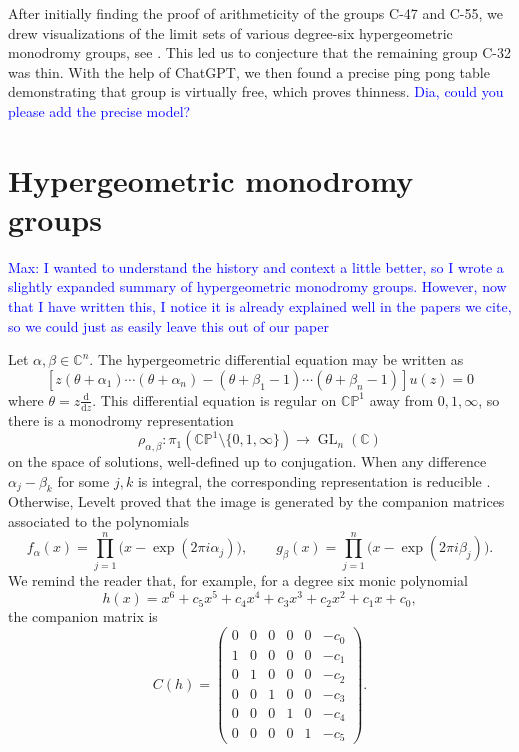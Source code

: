 \documentclass[11pt]{article}
\DeclareMathOperator{\GL}{GL}
\newcommand{\CP}{\mathbb{CP}}
\begin{document}
After initially finding the proof of arithmeticity of the groups C-47 and C-55, we drew visualizations of the limit sets of various degree-six hypergeometric monodromy groups, see .
This led us to conjecture that the remaining group C-32 was thin.
With the help of ChatGPT, we then found a precise ping pong table demonstrating that group is virtually free, which proves thinness. \textcolor{blue}{Dia, could you please add the precise model?}


\section{Hypergeometric monodromy groups}

\textcolor{blue}{Max: I wanted to understand the history and context a little better, so I wrote a slightly expanded summary of hypergeometric monodromy groups.
However, now that I have written this, I notice it is already explained well in the papers we cite, so we could just as easily leave this out of our paper}

Let $\alpha,\beta\in\mathbb{C}^n$. 
The hypergeometric differential equation may be written as 
    \[ [z(\theta + \alpha_1) \cdots (\theta +\alpha_n) - (\theta +\beta_1-1)\cdots(\theta+\beta_n-1)]u(z) = 0 \]
where $\theta = z \frac{\mathrm{d}}{\mathrm{d}z}$. 
This differential equation is regular on $\CP^1$ away from $0,1,\infty$, so there is a monodromy representation
    \[ \rho_{\alpha,\beta} \colon \pi_1(\CP^1 \setminus \{0,1,\infty\}) \to \GL_n(\mathbb{C}) \]
on the space of solutions, well-defined up to conjugation.
When any difference $\alpha_j - \beta_k$ for some $j,k$ is integral, the corresponding representation is reducible \cite[Proposition 2.7]{BeukersHeckman1989hypergeometric}. 
Otherwise, %
Levelt \cite{Levelt1961HypergeometricFunctions} proved that the image is generated by the companion matrices associated to the polynomials 
\[
  f_\alpha(x)=\prod_{j=1}^n\bigl(x-\exp(2\pi i\alpha_j)\bigr),\qquad
  g_\beta(x)=\prod_{j=1}^n\bigl(x-\exp(2\pi i\beta_j)\bigr).
\]
We remind the reader that, for example, for a degree six monic polynomial
\[
  h(x)=x^{6}+c_5x^5+c_4x^4+c_3x^3+c_2x^2+c_1x+c_0,
\]
the companion matrix is
\[
C(h)=
\begin{pmatrix}
0&0&0&0&0&-c_0\\
1&0&0&0&0&-c_1\\
0&1&0&0&0&-c_2\\
0&0&1&0&0&-c_3\\
0&0&0&1&0&-c_4\\
0&0&0&0&1&-c_5
\end{pmatrix}.
\]
\end{document}
